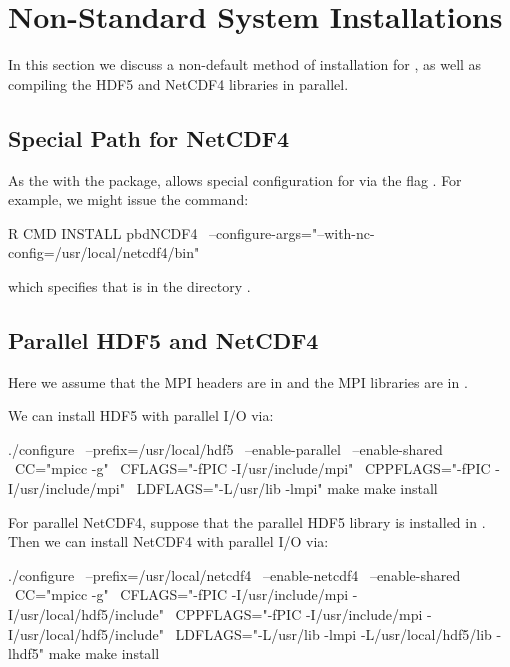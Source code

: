 
\section{Non-Standard System Installations}
\label{sec:useful_info}

In this section we discuss a non-default method of installation for , as well as compiling the HDF5 and NetCDF4 libraries in parallel.

\subsection[Special Path for NetCDF4]{Special Path for NetCDF4}
\label{sec:special_path}

As the with the  package,  allows special
configuration for  via the flag \code{-}.  For example, we might issue the command:
\begin{Command}
R CMD INSTALL pbdNCDF4 \
  --configure-args="--with-nc-config=/usr/local/netcdf4/bin"
\end{Command}
which specifies that  is in the directory .


\subsection[Parallel HDF5 and NetCDF4]{Parallel HDF5 and NetCDF4}
\label{sec:parallel_libraries}

Here we assume that the MPI headers are in  and the MPI libraries are in
\code{/usr/lib}. 

We can install HDF5 with parallel I/O via:
\begin{CodeOutput}[title=Compile parallel HDF5]
./configure \
    --prefix=/usr/local/hdf5 \
    --enable-parallel \
    --enable-shared \
    CC="mpicc -g" \
    CFLAGS="-fPIC -I/usr/include/mpi" \
    CPPFLAGS="-fPIC -I/usr/include/mpi" \
    LDFLAGS="-L/usr/lib -lmpi"
make
make install
\end{CodeOutput}

For parallel NetCDF4, suppose that the parallel HDF5 library is installed in . Then we can install
NetCDF4 with parallel I/O via:
\begin{Command}[title=Compile parallel NetCDF4]
./configure \
    --prefix=/usr/local/netcdf4 \
    --enable-netcdf4 \
    --enable-shared \
    CC="mpicc -g" \
    CFLAGS="-fPIC -I/usr/include/mpi -I/usr/local/hdf5/include" \
    CPPFLAGS="-fPIC -I/usr/include/mpi -I/usr/local/hdf5/include" \
    LDFLAGS="-L/usr/lib -lmpi -L/usr/local/hdf5/lib -lhdf5"
make
make install
\end{Command}

